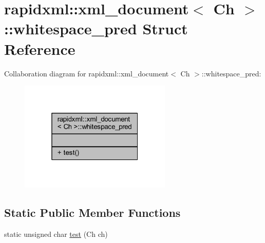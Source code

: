 \hypertarget{structrapidxml_1_1xml__document_1_1whitespace__pred}{\section{rapidxml\+:\+:xml\+\_\+document$<$ Ch $>$\+:\+:whitespace\+\_\+pred Struct Reference}
\label{structrapidxml_1_1xml__document_1_1whitespace__pred}
}


Collaboration diagram for rapidxml\+:\+:xml\+\_\+document$<$ Ch $>$\+:\+:whitespace\+\_\+pred\+:\nopagebreak
\begin{figure}[H]
\begin{center}
\leavevmode
\includegraphics[width=205pt]{structrapidxml_1_1xml__document_1_1whitespace__pred__coll__graph}
\end{center}
\end{figure}
\subsection*{Static Public Member Functions}
\begin{DoxyCompactItemize}
\item 
static unsigned char \hyperlink{structrapidxml_1_1xml__document_1_1whitespace__pred_a1dca1a175c784b2ef0b83f3957e820eb}{test} (Ch ch)
\end{DoxyCompactItemize}


